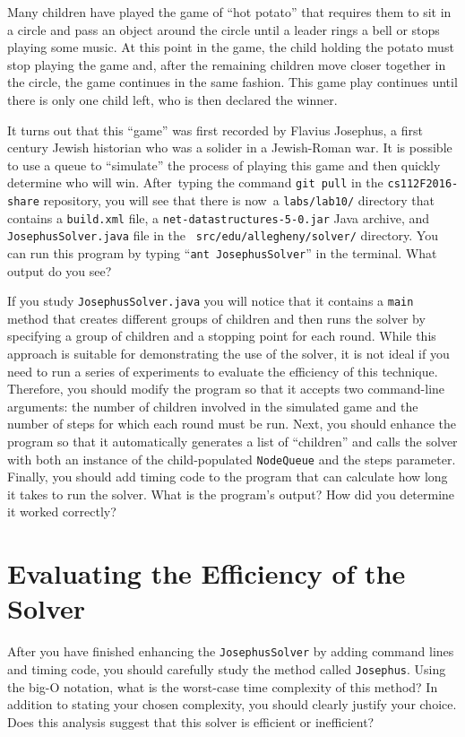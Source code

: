   Many children have played the game of ``hot potato'' that requires them to sit in a circle and pass an object around
  the circle until a leader rings a bell or stops playing some music.  At this point in the game, the child holding the
  potato must stop playing the game and, after the remaining children move closer together in the circle, the game
  continues in the same fashion. This game play continues until there is only one child left, who is then declared the
  winner.

  It turns out that this ``game'' was first recorded by Flavius Josephus, a first century Jewish historian who was a
  solider in a Jewish-Roman war.  It is possible to use a queue to ``simulate'' the process of playing this game and
  then quickly determine who will win.  \mbox{After typing} the command {\tt git pull} in the {\tt cs112F2016-share}
  repository, you will see that there is \mbox{now a} {\tt labs/lab10/} directory that contains a {\tt build.xml} file, a
  {\tt net-datastructures-5-0.jar} Java archive, and {\tt JosephusSolver.java} file in the {\tt
  src/edu/allegheny/solver/} directory. You can run this program by typing ``{\tt ant JosephusSolver}'' in the terminal.
  What output do you see?

  If you study {\tt JosephusSolver.java} you will notice that it contains a {\tt main} method that creates different
  groups of children and then runs the solver by specifying a group of children and a stopping point for each round.
  While this approach is suitable for demonstrating the use of the solver, it is not ideal if you need to run a series
  of experiments to evaluate the efficiency of this technique. Therefore, you should modify the program so that it
  accepts two command-line arguments: the number of children involved in the simulated game and the number of steps for
  which each round must be run. Next, you should enhance the program so that it automatically generates a list of
  ``children'' and calls the solver with both an instance of the child-populated {\tt NodeQueue} and the steps
  parameter. Finally, you should add timing code to the program that can calculate how long it takes to run the solver.
  What is the program's output? How did you determine it worked correctly?

\section*{Evaluating the Efficiency of the Solver}

  After you have finished enhancing the {\tt JosephusSolver} by adding command lines and timing code, you should
  carefully study the method called {\tt Josephus}.  Using the big-O notation, what is the worst-case time complexity of
  this method?  In addition to stating your chosen complexity, you should clearly justify your choice. Does this
  analysis suggest that this solver is efficient or inefficient?

